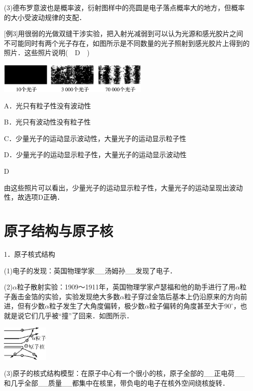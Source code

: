 (3)德布罗意波也是概率波，衍射图样中的亮圆是电子落点概率大的地方，但概率的大小受波动规律的支配．

{[}例3{]}用很弱的光做双缝干涉实验，把入射光减弱到可以认为光源和感光胶片之间不可能同时有两个光子存在，如图所示是不同数量的光子照射到感光胶片上得到的照片．这些照片说明(　D　)

\begin{center}\includegraphics[width=2.93403in,height=0.58472in]{media/image474.png}\end{center}

A．光只有粒子性没有波动性

B．光只有波动性没有粒子性

C．少量光子的运动显示波动性，大量光子的运动显示粒子性

D．少量光子的运动显示粒子性，大量光子的运动显示波动性
\begin{solution}
  D

  由这些照片可以看出，少量光子的运动显示粒子性，大量光子的运动呈现出波动性，故选项D正确．
\end{solution}

\newpage
\section{原子结构与原子核}

1．原子核式结构

(1)电子的发现：英国物理学家\_\_汤姆孙\_\_发现了电子．

(2)$\alpha$粒子散射实验：1909～1911年，英国物理学家卢瑟福和他的助手进行了用$\alpha$粒子轰击金箔的实验，实验发现绝大多数$\alpha$粒子穿过金箔后基本上仍沿原来的方向前进，但有少数$\alpha$粒子发生了大角度偏转，极少数$\alpha$粒子偏转的角度甚至大于$90^\circ$，也就是说它们几乎被``撞''了回来．如图所示．

\begin{center}\includegraphics[width=0.89653in,height=0.68889in]{media/image477.png}\end{center}

(3)原子的核式结构模型：在原子中心有一个很小的核，原子全部的\_\_正电荷\_\_和几乎全部\_\_质量\_\_都集中在核里，带负电的电子在核外空间绕核旋转．

